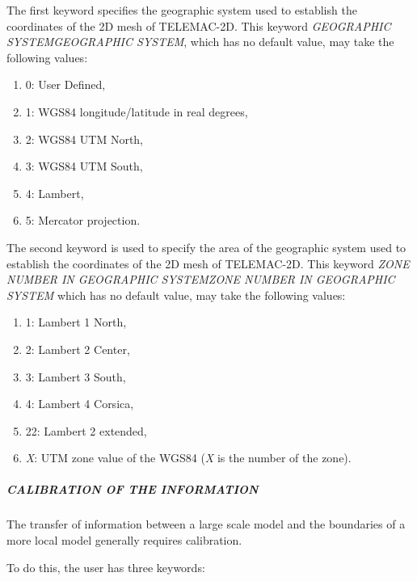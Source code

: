 \documentclass{article} %
\begin{document}
 The first keyword specifies the geographic system used to establish the coordinates of the 2D mesh of TELEMAC-2D. This keyword \textit{GEOGRAPHIC SYSTEMGEOGRAPHIC SYSTEM}, which has no default value, may take the following values:

\begin{enumerate}
\item  0: User Defined,

\item  1: WGS84 longitude/latitude in real degrees,

\item  2: WGS84 UTM North,

\item  3: WGS84 UTM South,

\item  4: Lambert,

\item  5: Mercator projection.
\end{enumerate}

 The second keyword is used to specify the area of the geographic system used to establish the coordinates of the 2D mesh of TELEMAC-2D. This keyword \textit{ZONE NUMBER IN GEOGRAPHIC SYSTEMZONE NUMBER IN GEOGRAPHIC SYSTEM} which has no default value, may take the following values:

\begin{enumerate}
\item  1: Lambert 1 North,

\item  2: Lambert 2 Center,

\item  3: Lambert 3 South,

\item  4: Lambert 4 Corsica,

\item  22: Lambert 2 extended,

\item  \textit{X}: UTM zone value of the WGS84 (\textit{X} is the number of the zone).
\end{enumerate}


\subparagraph{ CALIBRATION OF THE INFORMATION}

 The transfer of information between a large scale model and the boundaries of a more local model generally requires calibration.

 To do this, the user has three keywords:
\end{document}
